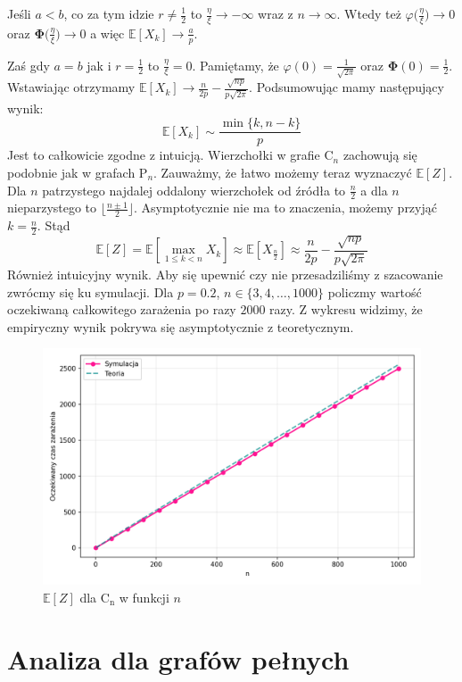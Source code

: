 Jeśli $a<b$, co za tym idzie $r\ne \frac{1}{2}$ to $\frac{\eta}{\xi}\to -\infty$ wraz z $n\to \infty$. Wtedy też $\varphi\Big(\frac{\eta}{\xi}\Big)\to 0$ oraz $\mathbf{\Phi}\Big(\frac{\eta}{\xi}\Big)\to 0$ a więc $\mathbb{E}[X_k] \to \frac{a}{p}$. 

Zaś gdy $a=b$ jak i $r=\frac{1}{2}$ to $\frac{\eta}{\xi}=0$. Pamiętamy, że $\varphi(0)=\frac{1}{\sqrt{2\pi}}$ oraz $\mathbf{\Phi}(0)=\frac{1}{2}$. Wstawiając otrzymamy $\mathbb{E}[X_k] \to \frac{n}{2p}-\frac{\sqrt{np}}{p\sqrt{2\pi}}$. 
Podsumowując mamy następujący wynik:
\[
    \mathbb{E}[X_k] \sim \frac{\min\{k,n-k\}}{p}
\]
Jest to całkowicie zgodne z intuicją. Wierzchołki w grafie $\mathrm{C}_n$ zachowują się podobnie jak w grafach $\mathrm{P}_n$.
Zauważmy, że łatwo możemy teraz wyznaczyć $\mathbb{E}[Z]$. Dla $n$ patrzystego najdalej oddalony wierzchołek od źródła to $\frac{n}{2}$ a dla $n$ nieparzystego to $\lfloor \frac{n\pm 1}{2}\rfloor$. Asymptotycznie nie ma to znaczenia, możemy przyjąć $k=\frac{n}{2}$. Stąd
\[
    \mathbb{E}[Z]=\mathbb{E}[\max_{1\le k < n} X_k] \approx \mathbb{E}[X_{\frac{n}{2}}] \approx \frac{n}{2p}-\frac{\sqrt{np}}{p\sqrt{2\pi}}
\]
Również intuicyjny wynik. Aby się upewnić czy nie przesadziliśmy z szacowanie zwrócmy się ku symulacji. Dla $p=0.2$, $n\in\{3,4,\dots, 1000\}$ policzmy wartość oczekiwaną całkowitego zarażenia po razy $2000$ razy. Z wykresu widzimy, że empiryczny wynik pokrywa się asymptotycznie z teoretycznym.
\begin{figure}[h!]
    \centering
    \includegraphics[width=1\textwidth]{../img/cycle/full_infection_expectation.png}
    \caption{$\mathbb{E}[Z]$ dla $\mathrm{C_n}$ w funkcji $n$}
\end{figure}

\section{Analiza dla grafów pełnych}

